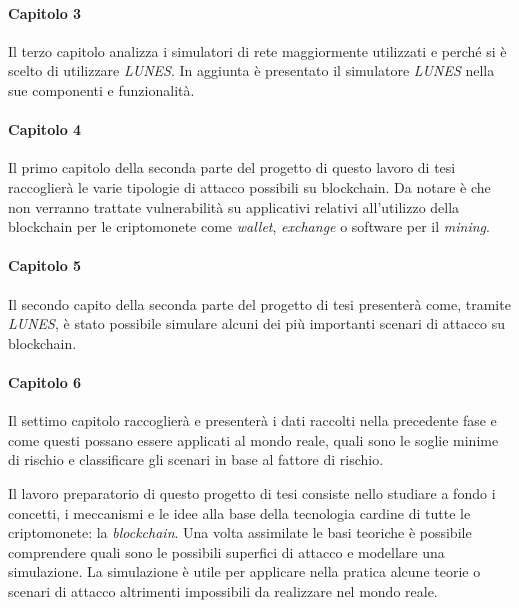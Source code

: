 \paragraph{Capitolo 3}
Il terzo capitolo analizza i simulatori di rete maggiormente utilizzati e perché si è scelto di utilizzare \textit{LUNES}.\newline
In aggiunta è presentato il simulatore \textit{LUNES} nella sue componenti e funzionalità.

\paragraph{Capitolo 4}
Il primo capitolo della seconda parte del progetto di questo lavoro di tesi raccoglierà le varie tipologie di attacco possibili su blockchain. Da notare è che non verranno trattate vulnerabilità su applicativi relativi all'utilizzo della blockchain per le criptomonete come \textit{wallet}, \textit{exchange} o software per il \textit{mining}.

\paragraph{Capitolo 5}
Il secondo capito della seconda parte del progetto di tesi presenterà come, tramite \textit{LUNES}, è stato possibile simulare alcuni dei più importanti scenari di attacco su blockchain.

\paragraph{Capitolo 6}
Il settimo capitolo raccoglierà e presenterà i dati raccolti nella precedente fase e come questi possano essere applicati al mondo reale, quali sono le soglie minime di rischio e classificare gli scenari in base al fattore di rischio.

Il lavoro preparatorio di questo progetto di tesi consiste nello studiare a fondo i concetti, i meccanismi e le idee alla base della tecnologia cardine di tutte le criptomonete: la \textit{blockchain}. Una volta assimilate le basi teoriche è possibile comprendere quali sono le possibili superfici di attacco e modellare una simulazione. La simulazione è utile per applicare nella pratica alcune teorie o scenari di attacco altrimenti impossibili da realizzare nel mondo reale.

